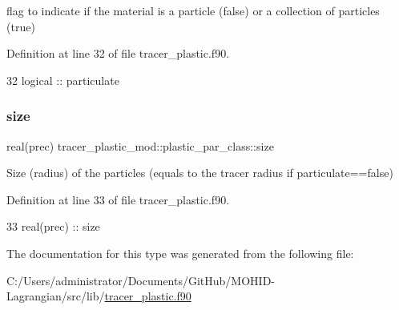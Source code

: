 flag to indicate if the material is a particle (false) or a collection of particles (true) 



Definition at line 32 of file tracer\+\_\+plastic.\+f90.


\begin{DoxyCode}
32         \textcolor{keywordtype}{logical}    :: particulate
\end{DoxyCode}
\mbox{\label{structtracer__plastic__mod_1_1plastic__par__class_a4436f491c11ebd046b3a74987ff71eee}} 
\subsubsection{\texorpdfstring{size}{size}}
{\footnotesize\ttfamily real(prec) tracer\+\_\+plastic\+\_\+mod\+::plastic\+\_\+par\+\_\+class\+::size\hspace{0.3cm}{\ttfamily [private]}}



Size (radius) of the particles (equals to the tracer radius if particulate==false) 



Definition at line 33 of file tracer\+\_\+plastic.\+f90.


\begin{DoxyCode}
33         \textcolor{keywordtype}{real(prec)} :: size
\end{DoxyCode}


The documentation for this type was generated from the following file\+:\begin{DoxyCompactItemize}
\item 
C\+:/\+Users/administrator/\+Documents/\+Git\+Hub/\+M\+O\+H\+I\+D-\/\+Lagrangian/src/lib/\mbox{\hyperlink{tracer__plastic_8f90}{tracer\+\_\+plastic.\+f90}}\end{DoxyCompactItemize}
